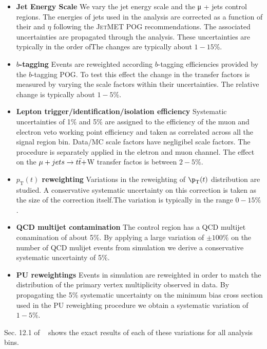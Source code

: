 \begin{itemize}
  \item{\bf Jet Energy Scale} We vary the jet energy scale \mj and \mmj the μ + jets control regions.  The energies of jets used in the analysis are corrected as a function of their \Pt and $\eta$ following the \textsc{JetMET} POG recommendations. The associated uncertainties are propagated through the analysis.
These uncertainties are typically in the order ofThe changes are typically about $1-15$\%.

\item{\bf $b$-tagging} Events are reweighted according $b$-tagging efficiencies provided by the $b$-tagging POG.  To test this effect the change in the transfer factors is measured by varying the scale factors within their uncertainties. The relative change is typically about $1-5$\%.

\item{\bf Lepton trigger/identification/isolation efficiency} Systematic uncertainties of 1\% and 5\% are assigned to the efficiency of the muon and electron veto working point efficiency and taken as correlated across all the signal region bin. Data/MC scale factors have negligibel scale factors. The procedure is separately applied in the eletron and muon channel. The effect on the $\mu + jets \to t\bar{t} + $W transfer factos is between $2-5\%$.

\item{\bf $p_\textrm{T}(t)$ reweighting} Variations in the reweighting of $\p_\textrm{T}(t)$ distribution are studied. A conservative systematic uncertainty on this correction is taken as the size of the correction itself.The variation is typically in the range $0-15\%$.

\item{\bf QCD multijet contamination} The \gj control region has a QCD multijet conamination of about 5\%. By applying a large variation of $\pm 100\%$ on the number of QCD mulijet events from simulation we derive a conservative systematic uncertainty of 5\%. 

\item{\bf PU reweightings} Events in simulation are reweighted in order to match the distribution of the primary vertex multiplicity observed in data.
By propagating the 5\% systematic uncertainty on the minimum bias cross section used in the PU reweighting procedure we obtain a systematic variation of $1-5\%$.
\end{itemize}


Sec. 12.1 of ~\cite{alphaTnote} shows the exact results of each of these variations for all analysis bins.





